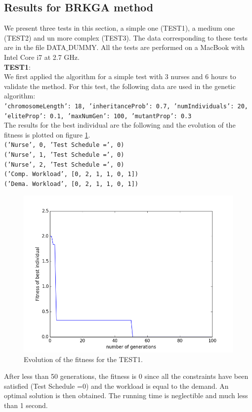 \documentclass[11pt]{article}
\begin{document}
\subsection{Results for BRKGA method}
We present three tests in this section, a simple one (TEST1), a medium one (TEST2) and un more complex (TEST3).  The data corresponding to these tests are in the file DATA$\_$DUMMY.  All the tests are performed on a MacBook with Intel Core i7 at 2.7 GHz.\\

\noindent
{\bf TEST1}:\\
We first applied the algorithm for a simple test with 3 nurses and 6 hours to validate the method.
For this test, the following data are used in the genetic algorithm:\\
{\tt 'chromosomeLength': 18, 'inheritanceProb': 0.7, 'numIndividuals': 20, 'eliteProp': 0.1, 'maxNumGen': 100, 'mutantProp': 0.3}\\
The results for the best individual are the following and the evolution of the fitness  is plotted on figure \ref{figBRKGA_TEST1}.\\
{\tt ('Nurse', 0, 'Test Schedule =', 0)\\
('Nurse', 1, 'Test Schedule =', 0)\\
('Nurse', 2, 'Test Schedule =', 0)\\
('Comp. Workload', [0, 2, 1, 1, 0, 1])\\
('Dema. Workload', [0, 2, 1, 1, 0, 1])\\
}
\begin{figure}[htbp]
\begin{center}
\includegraphics[scale=0.45]{./figure_BRKGA_1} 
\end{center}
\caption{ Evolution of the fitness for the TEST1.}
\label{figBRKGA_TEST1}
\end{figure}
After less than 50 generations, the fitness is 0  since all the constraints have been satisfied (Test Schedule =0) and the workload is equal to the demand. An optimal solution is then obtained. The running time is neglectible and much less than 1 second.
\end{document}
